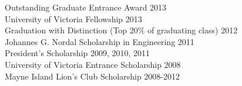\documentclass[margin,line]{resume}
\begin{document}
\begin{resume}
    Outstanding Graduate Entrance Award \hfill 2013\vspace{1mm}\\%
    University of Victoria Fellowship \hfill 2013\vspace{1mm}\\%
    Graduation with Distinction (Top 20\% of graduating class) \hfill 2012\vspace{1mm}\\%
    Johannes G. Nordal Scholarship in Engineering \hfill 2011\vspace{1mm}\\%
    President's Scholarship \hfill 2009, 2010, 2011\vspace{1mm}\\%
    University of Victoria Entrance Scholarship \hfill 2008\vspace{1mm}\\%
    Mayne Island Lion's Club Scholarship \hfill 2008-2012\vspace{1mm}\\%


\end{resume}
\end{document}
